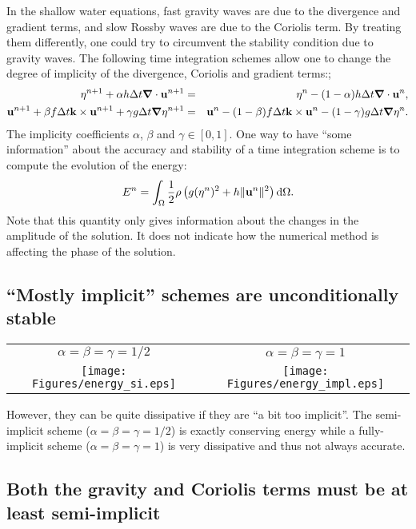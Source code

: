 In the shallow water equations, fast gravity waves are due to the divergence and gradient terms, and slow Rossby waves are due to the Coriolis term. By treating them differently, one could try to circumvent the stability condition due to gravity waves. The following time integration schemes allow one to change the degree of implicity of the divergence, Coriolis and gradient terms:;
\begin{eqnarray*}
	\eta^{n+1} + \alpha h \Delta t \mbox{\boldmath $\nabla$} \cdot \mathbf{u}^{n+1} &=& \eta^n - (1-\alpha) h \Delta t \mbox{\boldmath $\nabla$} \cdot \mathbf{u}^n,
	\\
	\mathbf{u}^{n+1} + \beta f \Delta t \mathbf{k} \times \mathbf{u}^{n+1} + \gamma g \Delta t \mbox{\boldmath $\nabla$} \eta^{n+1} &=& \mathbf{u}^n - (1-\beta) f \Delta t \mathbf{k} \times \mathbf{u}^n - (1-\gamma) g \Delta t \mbox{\boldmath $\nabla$} \eta^n.
\end{eqnarray*}
The implicity coefficients $\alpha$, $\beta$ and $\gamma \in [0,1]$. One way to have ``some information'' about the accuracy and stability of a time integration scheme is to compute the evolution of the energy:
\[
E^n = \int_{\Omega} \frac{1}{2} \rho \left( g (\eta^n)^2 + h \|\mathbf{u}^n\|^2 \right) \mathop{\mathrm{{}d}}\mathopen{} \Omega.
\]
Note that this quantity only gives information about the changes in the amplitude of the solution. It does not indicate how the numerical method is affecting the phase of the solution.


\subsection{``Mostly implicit'' schemes are unconditionally stable}

\begin{center}
	\begin{tabular}{cc}
		$\alpha = \beta = \gamma = 1/2$  & $\alpha = \beta = \gamma = 1$ \\
		\texttt{[image: Figures/energy\_si.eps]}
		&
		\texttt{[image: Figures/energy\_impl.eps]}
	\end{tabular}
\end{center}
However, they can be quite dissipative if they are ``a bit too implicit''. The semi-implicit scheme ($\alpha = \beta = \gamma = 1/2$) is exactly conserving energy while a fully-implicit scheme ($\alpha = \beta = \gamma = 1$) is very dissipative and thus not always accurate.


\subsection{Both the gravity and Coriolis terms must be at least semi-implicit}

